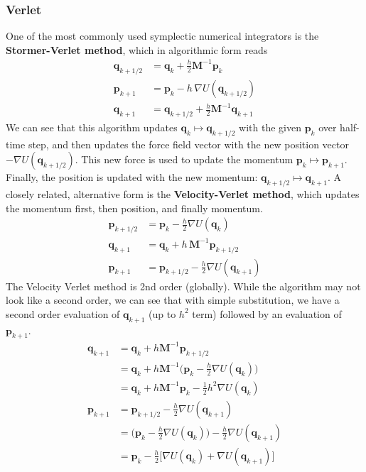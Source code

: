     \subsubsection{Verlet}

      One of the most commonly used symplectic numerical integrators is the \textbf{Stormer-Verlet method}, which in algorithmic form reads 
      \begin{align*}
        \mathbf{q}_{k + 1/2} & = \mathbf{q}_k + \frac{h}{2} \mathbf{M}^{-1} \mathbf{p}_k \\
        \mathbf{p}_{k+1} & = \mathbf{p}_k - h\, \nabla U(\mathbf{q}_{k+1/2}) \\
        \mathbf{q}_{k+1} & = \mathbf{q}_{k+1/2} + \frac{h}{2} \mathbf{M}^{-1} \mathbf{q}_{k+1} 
      \end{align*}
      We can see that this algorithm updates $\mathbf{q}_k \mapsto \mathbf{q}_{k+1/2}$ with the given $\mathbf{p}_k$ over half-time step, and then updates the force field vector with the new position vector $- \nabla U(\mathbf{q}_{k + 1/2})$. This new force is used to update the momentum $\mathbf{p}_k \mapsto \mathbf{p}_{k+1}$. Finally, the position is updated with the new momentum: $\mathbf{q}_{k + 1/2} \mapsto \mathbf{q}_{k+1}$. A closely related, alternative form is the \textbf{Velocity-Verlet method}, which updates the momentum first, then position, and finally momentum. 
      \begin{align*}
        \mathbf{p}_{k + 1/2} & = \mathbf{p}_k - \frac{h}{2} \nabla U (\mathbf{q}_k) \\
        \mathbf{q}_{k+1} & = \mathbf{q}_k + h \, \mathbf{M}^{-1} \mathbf{p}_{k + 1/2} \\
        \mathbf{p}_{k + 1} & = \mathbf{p}_{k + 1/2} - \frac{h}{2} \nabla U (\mathbf{q}_{k+1}) 
      \end{align*}
      The Velocity Verlet method is 2nd order (globally). While the algorithm may not look like a second order, we can see that with simple substitution, we have a second order evaluation of $\mathbf{q}_{k+1}$ (up to $h^2$ term) followed by an evaluation of $\mathbf{p}_{k+1}$. 
      \begin{align*}
        \mathbf{q}_{k+1} & = \mathbf{q}_k + h \mathbf{M}^{-1} \mathbf{p}_{k + 1/2} \\
        & = \mathbf{q}_k + h \mathbf{M}^{-1} \bigg( \mathbf{p}_k - \frac{h}{2} \nabla U (\mathbf{q}_k) \bigg) \\
        & = \mathbf{q}_k + h \mathbf{M}^{-1} \mathbf{p}_k - \frac{1}{2} h^2 \nabla U(\mathbf{q}_k) \\
        \mathbf{p}_{k+1} & = \mathbf{p}_{k + 1/2} - \frac{h}{2} \nabla U (\mathbf{q}_{k+1}) \\
        & = \bigg(\mathbf{p}_k - \frac{h}{2} \nabla U(\mathbf{q}_k)\bigg) - \frac{h}{2} \nabla U(\mathbf{q}_{k+1}) \\
        & = \mathbf{p}_k - \frac{h}{2} \big[ \nabla U(\mathbf{q}_k) + \nabla U(\mathbf{q}_{k+1}) \big]
      \end{align*}
